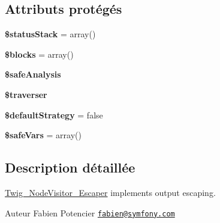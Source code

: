 \subsection*{Attributs protégés}
\begin{DoxyCompactItemize}
\item 
{\bfseries \$status\+Stack} = array()\hypertarget{class_twig___node_visitor___escaper_a5188483cd1e2d2c6609d2a642e72c44a}{}\label{class_twig___node_visitor___escaper_a5188483cd1e2d2c6609d2a642e72c44a}

\item 
{\bfseries \$blocks} = array()\hypertarget{class_twig___node_visitor___escaper_a320aeae1df42ee73ab4b3d9f7cf4ef3f}{}\label{class_twig___node_visitor___escaper_a320aeae1df42ee73ab4b3d9f7cf4ef3f}

\item 
{\bfseries \$safe\+Analysis}\hypertarget{class_twig___node_visitor___escaper_aa0090a6a2f00fcb39fa723d6a79b53cb}{}\label{class_twig___node_visitor___escaper_aa0090a6a2f00fcb39fa723d6a79b53cb}

\item 
{\bfseries \$traverser}\hypertarget{class_twig___node_visitor___escaper_ae6725770c4bf11723bd3586bc0699c82}{}\label{class_twig___node_visitor___escaper_ae6725770c4bf11723bd3586bc0699c82}

\item 
{\bfseries \$default\+Strategy} = false\hypertarget{class_twig___node_visitor___escaper_add8b7fa48484c8d41707819868a0b32f}{}\label{class_twig___node_visitor___escaper_add8b7fa48484c8d41707819868a0b32f}

\item 
{\bfseries \$safe\+Vars} = array()\hypertarget{class_twig___node_visitor___escaper_ac4491da07b27e3c0f9b37962428e567c}{}\label{class_twig___node_visitor___escaper_ac4491da07b27e3c0f9b37962428e567c}

\end{DoxyCompactItemize}


\subsection{Description détaillée}
\hyperlink{class_twig___node_visitor___escaper}{Twig\+\_\+\+Node\+Visitor\+\_\+\+Escaper} implements output escaping.

\begin{DoxyAuthor}{Auteur}
Fabien Potencier \href{mailto:fabien@symfony.com}{\tt fabien@symfony.\+com} 
\end{DoxyAuthor}


